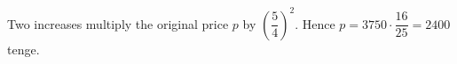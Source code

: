 Two increases multiply the original price $p$ by $\left(\dfrac{5}{4}\right)^2$. Hence $p=3750\cdot\dfrac{16}{25}=\boxed{2400}$ tenge.
